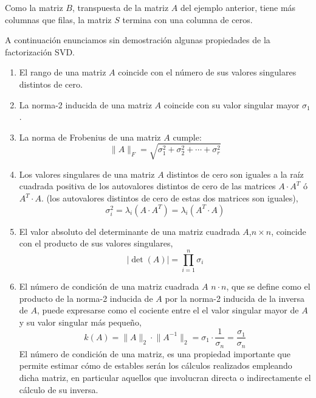 Como la matriz $B$, transpuesta de la matriz $A$ del ejemplo anterior, tiene más columnas que filas, la matriz $S$ termina con una columna de ceros.

A continuación enunciamos sin demostración algunas propiedades de la factorización SVD.

\begin{enumerate}
\item El rango de una matriz $A$ coincide con el número de sus valores singulares distintos de cero.
\item La norma-2 inducida de una matriz $A$ coincide con su valor singular mayor $\sigma_1$.
\item La norma de Frobenius de una matriz $A$ cumple:
\begin{equation*}
\lVert A \rVert_{F}=\sqrt{\sigma_1^2+\sigma_2^2+\cdots +\sigma_r^2}
\end{equation*}
\item Los valores singulares de una matriz $A$ distintos de cero son iguales a la raíz cuadrada positiva de los autovalores distintos de cero de las matrices $A\cdot A^T$ ó $A^T\cdot A$. (los autovalores distintos de cero de estas dos matrices son iguales),
\begin{equation*}
\sigma_i^2=\lambda_i(A\cdot A^T)=\lambda_i(A^T\cdot A)
\end{equation*}
\item El valor absoluto del determinante de una matriz cuadrada $A$,$n\times n$, coincide con el producto de sus valores singulares,
\begin{equation*}
\vert \det(A) \vert = \prod_{i=1}^n \sigma_i
\end{equation*}
\item El número de condición de una matriz cuadrada $A$ $n\cdot n$, que se define como el producto de la norma-2 inducida de $A$ por la norma-2 inducida de la inversa de $A$, puede expresarse como el cociente entre el el valor singular mayor de $A$ y su valor singular más pequeño,
\begin{equation*}
k(A)=\lVert A \rVert_2 \cdot \lVert A^{-1} \rVert_2 = \sigma_1 \cdot \frac{1}{\sigma_n}=\frac{\sigma_1}{\sigma_n}
\end{equation*}
El número de condición de una matriz, es una propiedad importante que permite estimar cómo de estables serán los cálculos realizados empleando dicha matriz, en particular aquellos que involucran directa o indirectamente el cálculo de su inversa.

\end{enumerate}


